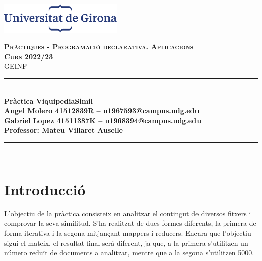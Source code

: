 \documentclass[11pt,a4paper]{article}
\begin{document}
    \begin{titlepage}
        \newcommand{\HRule}{\rule{\linewidth}{0.5mm}} %
	\begin{flushleft}
            \includegraphics[height=1.5cm]{EPS.png}\\\vfill
        \end{flushleft}
        \center %
        \textsc{\huge \bfseries Pràctiques  - Programació declarativa. Aplicacions}\\[0.25cm]
        \textsc{\Large \bfseries Curs 2022/23}\\[0.25cm]
        \textsc{\large GEINF }
	\HRule \\[0.4cm]
        { \huge \bfseries Pràctica ViquipediaSimil} \\[0.25cm]{\Large \bfseries Angel Molero 41512839R – u1967593@campus.udg.edu}\\[0.40cm] %
	 {\Large \bfseries Gabriel Lopez 41511387K – u1968394@campus.udg.edu}\\[0.4cm]
	 {\Large \bfseries Professor: Mateu Villaret Auselle }\\[0.4cm]

        \HRule \\\vfill
	\end{titlepage}

\tableofcontents

\clearpage

\appendix

\section{Introducció}

L'objectiu de la pràctica consisteix en analitzar el contingut de diversos fitxers i comprovar la seva similitud. S'ha realitzat de dues formes diferents, la primera de forma iterativa i la segona mitjançant mappers i reducers. 
Encara que l'objectiu sigui el mateix, el resultat final será diferent, ja que, a la primera s'utilitzen un número reduït de documents a analitzar, mentre que a la segona s'utilitzen 5000.
\end{document}
